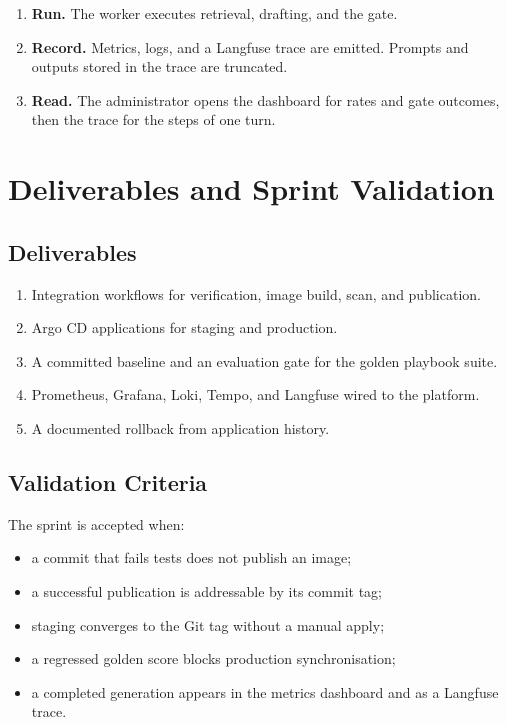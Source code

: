 \begin{enumerate}[label=\arabic*.,leftmargin=2em]
  \item \textbf{Run.} The worker executes retrieval, drafting, and the gate.
  \item \textbf{Record.} Metrics, logs, and a Langfuse trace are emitted. Prompts and outputs stored in the trace are truncated.
  \item \textbf{Read.} The administrator opens the dashboard for rates and gate outcomes, then the trace for the steps of one turn.
\end{enumerate}

\section{Deliverables and Sprint Validation}

\subsection{Deliverables}

\begin{enumerate}[label=\arabic*.,leftmargin=2em,itemsep=0.2em]
  \item Integration workflows for verification, image build, scan, and publication.
  \item Argo CD applications for staging and production.
  \item A committed baseline and an evaluation gate for the golden playbook suite.
  \item Prometheus, Grafana, Loki, Tempo, and Langfuse wired to the platform.
  \item A documented rollback from application history.
\end{enumerate}

\subsection{Validation Criteria}

The sprint is accepted when:

\begin{itemize}[label=--,leftmargin=1.6em,itemsep=0.15em]
  \item a commit that fails tests does not publish an image;
  \item a successful publication is addressable by its commit tag;
  \item staging converges to the Git tag without a manual apply;
  \item a regressed golden score blocks production synchronisation;
  \item a completed generation appears in the metrics dashboard and as a Langfuse trace.
\end{itemize}

